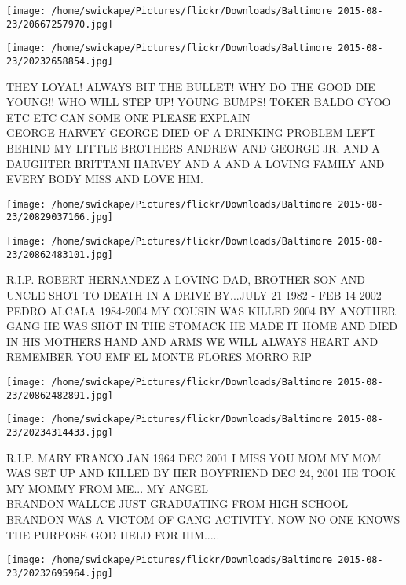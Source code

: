 \documentclass[10pt,letterpaper]{article}
\begin{document}
\texttt{[image: /home/swickape/Pictures/flickr/Downloads/Baltimore 2015-08-23/20667257970.jpg]}

\vspace{0.25in}
\texttt{[image: /home/swickape/Pictures/flickr/Downloads/Baltimore 2015-08-23/20232658854.jpg]}

THEY LOYAL!  ALWAYS BIT THE BULLET!  WHY DO THE GOOD DIE YOUNG!! WHO WILL STEP UP!  YOUNG BUMPS! TOKER BALDO CYOO ETC ETC CAN SOME ONE PLEASE EXPLAIN\\
GEORGE HARVEY GEORGE DIED OF A DRINKING PROBLEM LEFT BEHIND MY LITTLE BROTHERS ANDREW AND GEORGE JR. AND A DAUGHTER BRITTANI HARVEY AND A AND A LOVING FAMILY AND EVERY BODY MISS AND LOVE HIM.\\
\pagebreak

\texttt{[image: /home/swickape/Pictures/flickr/Downloads/Baltimore 2015-08-23/20829037166.jpg]}

\vspace{0.25in}
\texttt{[image: /home/swickape/Pictures/flickr/Downloads/Baltimore 2015-08-23/20862483101.jpg]}

R.I.P. ROBERT HERNANDEZ A LOVING DAD, BROTHER SON AND UNCLE SHOT TO DEATH IN A DRIVE BY...JULY 21 1982 {-} FEB 14 2002\\
PEDRO ALCALA 1984{-}2004 MY COUSIN WAS KILLED 2004 BY ANOTHER GANG HE WAS SHOT IN THE STOMACK HE MADE IT HOME AND DIED IN HIS MOTHERS HAND AND ARMS WE WILL ALWAYS HEART AND REMEMBER YOU EMF EL MONTE FLORES MORRO RIP\\
\pagebreak

\texttt{[image: /home/swickape/Pictures/flickr/Downloads/Baltimore 2015-08-23/20862482891.jpg]}

\vspace{0.25in}
\texttt{[image: /home/swickape/Pictures/flickr/Downloads/Baltimore 2015-08-23/20234314433.jpg]}

R.I.P. MARY FRANCO JAN 1964 DEC 2001 I MISS YOU MOM MY MOM WAS SET UP AND KILLED BY HER BOYFRIEND DEC 24, 2001 HE TOOK MY MOMMY FROM ME... MY ANGEL\\
BRANDON WALLCE JUST GRADUATING FROM HIGH SCHOOL BRANDON WAS A VICTOM OF GANG ACTIVITY.  NOW NO ONE KNOWS THE PURPOSE GOD HELD FOR HIM.....\\
\pagebreak

\texttt{[image: /home/swickape/Pictures/flickr/Downloads/Baltimore 2015-08-23/20232695964.jpg]}
\end{document}
